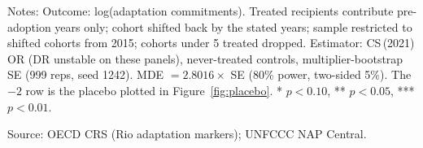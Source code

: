 \begin{table}[H]
\centering
\caption{Placebo ladder: fictitious adoption dates 2 to 5 years before the actual one}
\label{tab:att_placebo_ladder}
\begingroup\small
{}
\endgroup
\par\vspace{4pt}
\begin{minipage}{\linewidth}\footnotesize
Notes: Outcome: log(adaptation commitments). Treated recipients contribute pre-adoption years only; cohort shifted back by the stated years; sample restricted to shifted cohorts from 2015; cohorts under 5 treated dropped. Estimator: CS\,(2021) OR (DR unstable on these panels), never-treated controls, multiplier-bootstrap SE (999 reps, seed 1242). MDE $= 2.8016 \times$ SE (80\% power, two-sided 5\%). The $-2$ row is the placebo plotted in Figure~\ref{fig:placebo}. * $p<0.10$, ** $p<0.05$, *** $p<0.01$.\par
Source: OECD CRS (Rio adaptation markers); UNFCCC NAP Central.
\end{minipage}
\end{table}

